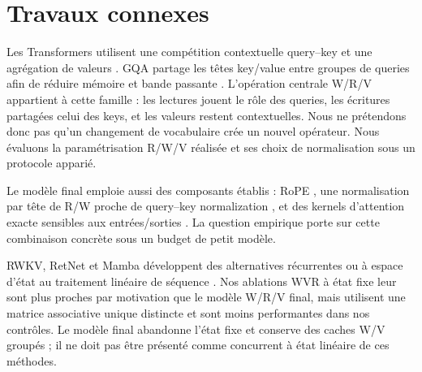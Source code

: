 \section{Travaux connexes}

Les Transformers utilisent une compétition contextuelle query--key et une agrégation de valeurs \citep{vaswani2017attention}. GQA partage les têtes key/value entre groupes de queries afin de réduire mémoire et bande passante \citep{ainslie2023gqa}. L'opération centrale W/R/V appartient à cette famille : les lectures jouent le rôle des queries, les écritures partagées celui des keys, et les valeurs restent contextuelles. Nous ne prétendons donc pas qu'un changement de vocabulaire crée un nouvel opérateur. Nous évaluons la paramétrisation R/W/V réalisée et ses choix de normalisation sous un protocole apparié.

Le modèle final emploie aussi des composants établis : RoPE \citep{su2021roformer}, une normalisation par tête de R/W proche de query--key normalization \citep{henry2020qknorm}, et des kernels d'attention exacte sensibles aux entrées/sorties \citep{dao2022flashattention}. La question empirique porte sur cette combinaison concrète sous un budget de petit modèle.

RWKV, RetNet et Mamba développent des alternatives récurrentes ou à espace d'état au traitement linéaire de séquence \citep{peng2023rwkv,sun2023retnet,gu2023mamba}. Nos ablations WVR à état fixe leur sont plus proches par motivation que le modèle W/R/V final, mais utilisent une matrice associative unique distincte et sont moins performantes dans nos contrôles. Le modèle final abandonne l'état fixe et conserve des caches W/V groupés ; il ne doit pas être présenté comme concurrent à état linéaire de ces méthodes.
